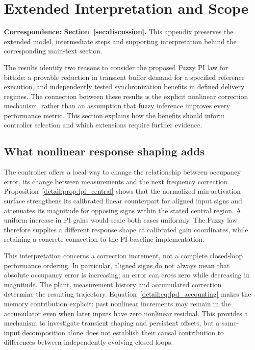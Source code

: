 \section{Extended Interpretation and Scope}
\label{app:discussion}
\noindent\textbf{Correspondence: Section~\ref{sec:discussion}.} This appendix preserves the extended model, intermediate steps and supporting interpretation behind the corresponding main-text section.


\label{detail:sec:discussion}

The results identify two reasons to consider the proposed Fuzzy PI law
for bittide: a provable reduction in transient buffer demand for a
specified reference execution, and independently tested synchronization
benefits in defined delivery regimes. The connection between these
results is the explicit nonlinear correction mechanism, rather than
an assumption that fuzzy inference improves every performance metric.
This section explains how the benefits should inform controller
selection and which extensions require further evidence.

\subsection{What nonlinear response shaping adds}
\label{detail:subsec:discussion_mechanism}

The controller offers a local way to change the relationship between
occupancy error, its change between measurements and the next frequency
correction. Proposition~\ref{detail:prop:fpi_central} shows that the normalized
min-activation surface strengthens its calibrated linear counterpart
for aligned input signs and attenuates its magnitude for opposing signs
within the stated central region. A uniform increase in PI gains would
scale both cases uniformly. The Fuzzy law therefore supplies
a different response shape at calibrated gain coordinates, while
retaining a concrete connection to the PI baseline implementation.

This interpretation concerns a correction increment, not a complete
closed-loop performance ordering. In particular, aligned signs do not
always mean that absolute occupancy error is increasing; an error can
cross zero while decreasing in magnitude. The plant, measurement
history and accumulated correction determine the resulting trajectory.
Equation~\eqref{detail:eq:fpd_accounting} makes the memory contribution explicit:
past nonlinear increments may remain in the accumulator even when
later inputs have zero nonlinear residual. This provides a mechanism
to investigate transient shaping and persistent offsets, but a
same-input decomposition alone does not establish their causal
contribution to differences between independently evolving closed loops.

